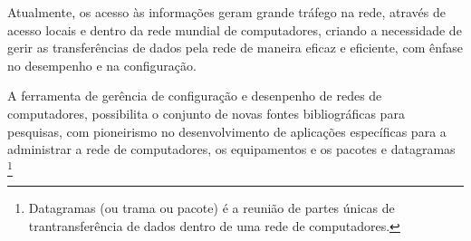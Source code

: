 
\par Atualmente, os acesso às informações geram grande tráfego na rede, através de acesso
locais e dentro da rede mundial de computadores, criando a necessidade de gerir as transferências
de dados pela rede de maneira eficaz e eficiente, com ênfase no desempenho e na configuração.

\par A ferramenta de gerência de configuração e desenpenho de redes de
computadores, possibilita o conjunto de novas fontes bibliográficas para
pesquisas, com pioneirismo no desenvolvimento de aplicações específicas para a administrar a 
rede de computadores, os equipamentos e os pacotes e datagramas
\footnote{Datagramas (ou trama ou pacote) é a reunião de partes únicas de 
trantransferência de dados dentro de uma rede de computadores.}



 

